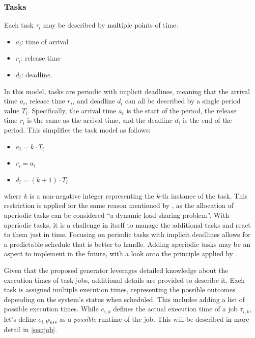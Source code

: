 \subsubsection{Tasks}\label{sec:task}
Each task $\tau_i$ may be described by multiple points of time:
\begin{itemize}
    \item $a_i$: time of arrival
    \item $r_i$: release time
    \item $d_i$: deadline.
\end{itemize}
In this model, tasks are periodic with implicit deadlines, meaning that the arrival time $a_i$, release time $r_i$, and deadline $d_i$ can all be described by a single period value $T_i$. 
Specifically, the arrival time $a_i$ is the start of the period, the release time $r_i$ is the same as the arrival time, and the deadline $d_i$ is the end of the period. 
This simplifies the task model as follows:
\begin{itemize}
    \item $a_i = k \cdot T_i$
    \item $r_i = a_i$
    \item $d_i = (k + 1) \cdot T_i$
\end{itemize}
where $k$ is a non-negative integer representing the $k$-th instance of the task.
This restriction is applied for the same reason mentioned by \textcite{dar-tzenpengAssignmentSchedulingCommunicating1997}, as the allocation of aperiodic tasks can be considered ``a dynamic load sharing problem''\cite{dar-tzenpengAssignmentSchedulingCommunicating1997}. 
With aperiodic tasks, it is a challenge in itself to manage the additional tasks and react to them just in time.
Focusing on periodic tasks with implicit deadlines allows for a predictable schedule that is better to handle.
Adding aperiodic tasks may be an aspect to implement in the future, with a look onto the principle applied by \textcite{dar-tzenpengAssignmentSchedulingCommunicating1997}.

Given that the proposed generator leverages detailed knowledge about the execution times of task jobs, additional details are provided to describe it. 
Each task is assigned multiple execution times, representing the possible outcomes depending on the system's status when scheduled. This includes adding a list of possible execution times.
While $e_{i,k}$ defines the actual execution time of a job $\tau_{i,k}$\cite{buttazzoHardRealTimeComputing2024}, let's define $e_{{i,k}^poss}$ as a \textit{possible} runtime of the job.
This will be described in more detail in \cref{sec:job}.

